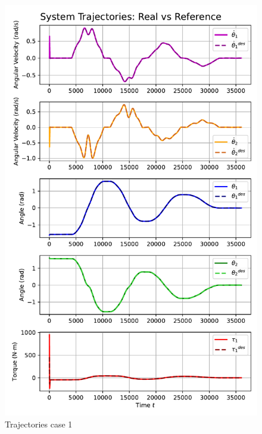 \begin{figure}[htb]
    \centering
    \includegraphics[width=1\linewidth]{img/3-task3/LQR1.pdf}
    \caption{Trajectories case 1}
    \label{fig:dtheta1-evolution}
\end{figure}

